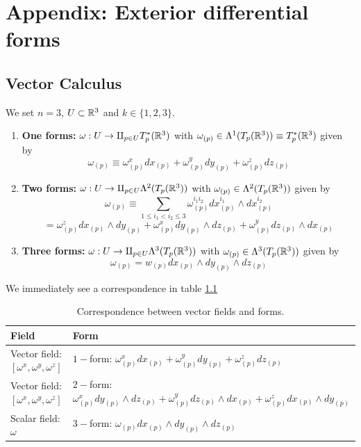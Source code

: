 \chapter{Appendix: Exterior differential forms}


\section{Vector Calculus}\label{app:vector_calculus}
We set $n=3$, $U\subset \mathbb{R}^3$ and $k\in \{1,2,3\}$.

\begin{enumerate}
    \item \textbf{One forms:} $\omega: U\to \amalg_{p\in U} T_p^*(\mathbb{R}^3)$ with $\omega_{(p)}\in \Lambda^1(T_p(\mathbb{R}^3))\equiv T^*_p(\mathbb{R}^3)$ given by $$\omega_{(p)}\equiv \omega^x_{(p)}dx_{(p)}+\omega^y_{(p)}dy_{(p)}+\omega^z_{(p)}dz_{(p)} $$
    \item \textbf{Two forms:} $\omega: U\to \amalg_{p\in U}\Lambda^2(T_p(\mathbb{R}^3)) $ with $\omega_{(p)}\in \Lambda^2(T_p(\mathbb{R}^3))$ given by $$\omega_{(p)}\equiv \sum_{1\leq i_1<i_2\leq 3} \omega^{i_1i_2}_{(p)} dx^{i_1}_{(p)}\wedge dx^{i_2}_{(p)} $$ $$= \omega^{z}_{(p)} dx_{(p)}\wedge dy_{(p)} +\omega^{x}_{(p)} dy_{(p)}\wedge dz_{(p)} +\omega^{y}_{(p)} dz_{(p)}\wedge dx_{(p)}   $$
    \item \textbf{Three forms:} $\omega:U\to \amalg_{p\in U}\Lambda^3(T_p(\mathbb{R}^3)) $ with $\omega_{(p)}\in \Lambda^3(T_p(\mathbb{R}^3))$ given by $$\omega_{(p)}=w_{(p)} dx_{(p)}\wedge dy_{(p)}\wedge dz_{(p)} $$
\end{enumerate}

We immediately see a correspondence in table \ref{tab:vector_form}

\begin{table}[ht]
\centering
\caption{Correspondence between vector fields and forms.}
\label{tab:vector_form}
\begin{tabular}{|l|l|}
\hline
Field & Form \\
\hline
Vector field: $[\omega^x, \omega^y,\omega^z] $  & $1-$form: $\omega^x_{(p)}dx_{(p)}+\omega^y_{(p)}dy_{(p)}+\omega^z_{(p)}dz_{(p)}  $ \\
Vector field: $[\omega^x, \omega^y,\omega^z] $  & $2-$form: $\omega^x_{(p)} dy_{(p)}\wedge dz_{(p)}+ \omega^y_{(p)} dz_{(p)}\wedge dx_{(p)}+\omega^z_{(p)} dx_{(p)}\wedge dy_{(p)}$ \\
Scalar field: $\omega $  & $3-$form: $\omega_{(p)}dx_{(p)}\wedge dy_{(p)} \wedge dz_{(p)} $ \\
\hline
\end{tabular}
\end{table}

